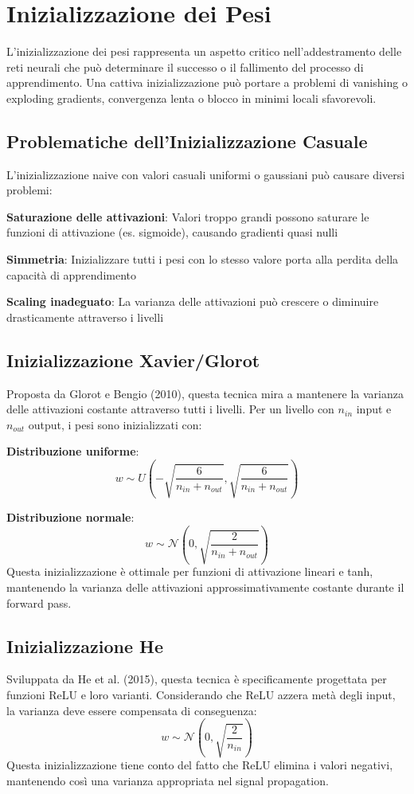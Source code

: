 \section{Inizializzazione dei Pesi}
L'inizializzazione dei pesi rappresenta un aspetto critico nell'addestramento delle reti neurali che può determinare il successo o il fallimento del processo di apprendimento. Una cattiva inizializzazione può portare a problemi di vanishing o exploding gradients, convergenza lenta o blocco in minimi locali sfavorevoli.

\subsection{Problematiche dell'Inizializzazione Casuale}
L'inizializzazione naive con valori casuali uniformi o gaussiani può causare diversi problemi:
\begin{compactitemize}
\item \textbf{Saturazione delle attivazioni}: Valori troppo grandi possono saturare le funzioni di attivazione (es. sigmoide), causando gradienti quasi nulli
\item \textbf{Simmetria}: Inizializzare tutti i pesi con lo stesso valore porta alla perdita della capacità di apprendimento
\item \textbf{Scaling inadeguato}: La varianza delle attivazioni può crescere o diminuire drasticamente attraverso i livelli
\end{compactitemize}

\subsection{Inizializzazione Xavier/Glorot}
Proposta da Glorot e Bengio (2010), questa tecnica mira a mantenere la varianza delle attivazioni costante attraverso tutti i livelli. Per un livello con $n_{in}$ input e $n_{out}$ output, i pesi sono inizializzati con:

\textbf{Distribuzione uniforme}:
\[
w \sim U\left(-\sqrt{\frac{6}{n_{in} + n_{out}}}, \sqrt{\frac{6}{n_{in} + n_{out}}}\right)
\]

\textbf{Distribuzione normale}:
\[
w \sim \mathcal{N}\left(0, \sqrt{\frac{2}{n_{in} + n_{out}}}\right)
\]
Questa inizializzazione è ottimale per funzioni di attivazione lineari e tanh, mantenendo la varianza delle attivazioni approssimativamente costante durante il forward pass.

\subsection{Inizializzazione He}
Sviluppata da He et al. (2015), questa tecnica è specificamente progettata per funzioni ReLU e loro varianti. Considerando che ReLU azzera metà degli input, la varianza deve essere compensata di conseguenza:
\[
w \sim \mathcal{N}\left(0, \sqrt{\frac{2}{n_{in}}}\right)
\]
Questa inizializzazione tiene conto del fatto che ReLU elimina i valori negativi, mantenendo così una varianza appropriata nel signal propagation.

